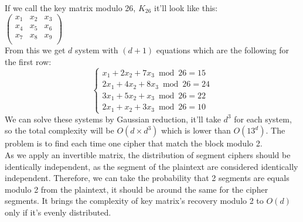 \documentclass{article}
\begin{document}
If we call the key matrix modulo 26, $K_{26}$ it'll look like this:\\
$ \begin{pmatrix}
	x_1 & x_2 & x_3\\
	x_4 & x_5 & x_6\\
	x_7 & x_8 & x_9\\
	\end{pmatrix}$\\
From this we get $d$ system with $(d+1)$ equations which are the following for the first row:\\
\[ \begin{cases}
      x_1 +2x_2 + 7x_3 \bmod 26 =15\\
      2x_1 +4x_2 +8x_3 \bmod 26 = 24\\
			3x_1 + 5x_2 + x_3 \bmod 26 = 22\\
			2x_1 + x_2 +3x_3 \bmod 26 =10
   \end{cases}
\]
We can solve these systems by Gaussian reduction, it'll take $d^3$ for each system, so the total complexity will be $O(d \times d^{3})$ which is lower than $O(13^d)$.
The problem is to find each time one cipher that match the block modulo 2.\\
As we apply an invertible matrix, the distribution of segment ciphers should be identically independent, as the segment of the plaintext are considered identically independent. Therefore, we can take the probability that 2 segments are equals modulo 2 from the plaintext, it should be around the same for the cipher segments. It brings the complexity of key matrix's recovery modulo 2 to $O(d)$ only if it's evenly distributed.


\appendix
\newpage
\end{document}
